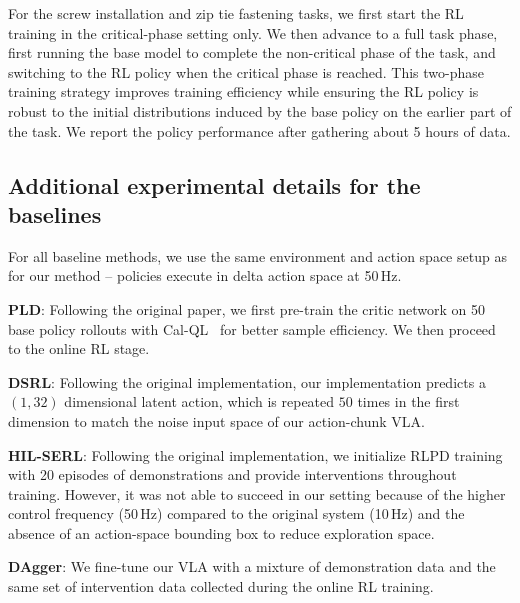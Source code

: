 For the screw installation and zip tie fastening tasks, we first start the RL training in the critical-phase setting only. We then advance to a full task phase, first running the base model to complete the non-critical phase of the task, and switching to the RL policy when the critical phase is reached. This two-phase training strategy improves training efficiency while ensuring the RL policy is robust to the initial distributions induced by the base policy on the earlier part of the task. We report the policy performance after gathering about 5 hours of data. 


\subsection{Additional experimental details for the baselines}
For all baseline methods, we use the same environment and action space setup as for our method -- policies execute in delta action space at 50\,Hz.
\label{app:baseline}

\textbf{PLD}: Following the original paper, we first pre-train the critic network on 50 base policy rollouts with Cal-QL~\cite{nakamoto2023cal} for better sample efficiency. We then proceed to the online RL stage.

\textbf{DSRL}: Following the original implementation, our implementation predicts a $(1, 32)$ dimensional latent action, which is repeated $50$ times in the first dimension to match the noise input space of our action-chunk VLA.

\textbf{HIL-SERL}: Following the original implementation, we initialize RLPD training with 20 episodes of demonstrations and provide interventions throughout training. However, it was not able to succeed in our setting because of the higher control frequency (50\,Hz) compared to the original system (10\,Hz) and the absence of an action-space bounding box to reduce exploration space. 

\textbf{DAgger}: We fine-tune our VLA with a mixture of demonstration data and the same set of intervention data collected during the online RL training. 